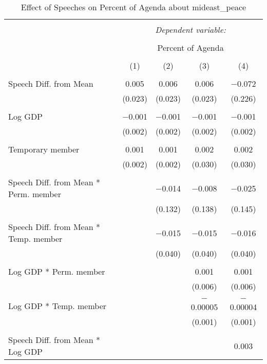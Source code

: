 
\begin{table}[!htbp] \centering 
  \caption{Effect of Speeches on Percent of Agenda about mideast_peace} 
  \label{} 
\begin{tabular}{@{\extracolsep{5pt}}lcccc} 
\\[-1.8ex]\hline 
\hline \\[-1.8ex] 
 & \multicolumn{4}{c}{\textit{Dependent variable:}} \\ 
\cline{2-5} 
\\[-1.8ex] & \multicolumn{4}{c}{Percent of Agenda} \\ 
\\[-1.8ex] & (1) & (2) & (3) & (4)\\ 
\hline \\[-1.8ex] 
 Speech Diff. from Mean & 0.005 & 0.006 & 0.006 & $-$0.072 \\ 
  & (0.023) & (0.023) & (0.023) & (0.226) \\ 
  & & & & \\ 
 Log GDP & $-$0.001 & $-$0.001 & $-$0.001 & $-$0.001 \\ 
  & (0.002) & (0.002) & (0.002) & (0.002) \\ 
  & & & & \\ 
 Temporary member & 0.001 & 0.001 & 0.002 & 0.002 \\ 
  & (0.002) & (0.002) & (0.030) & (0.030) \\ 
  & & & & \\ 
 Speech Diff. from Mean * Perm. member &  & $-$0.014 & $-$0.008 & $-$0.025 \\ 
  &  & (0.132) & (0.138) & (0.145) \\ 
  & & & & \\ 
 Speech Diff. from Mean * Temp. member &  & $-$0.015 & $-$0.015 & $-$0.016 \\ 
  &  & (0.040) & (0.040) & (0.040) \\ 
  & & & & \\ 
 Log GDP * Perm. member &  &  & 0.001 & 0.001 \\ 
  &  &  & (0.006) & (0.006) \\ 
  & & & & \\ 
 Log GDP * Temp. member &  &  & $-$0.00005 & $-$0.00004 \\ 
  &  &  & (0.001) & (0.001) \\ 
  & & & & \\ 
 Speech Diff. from Mean * Log GDP &  &  &  & 0.003 \\ 

\end{tabular}
\end{table}
